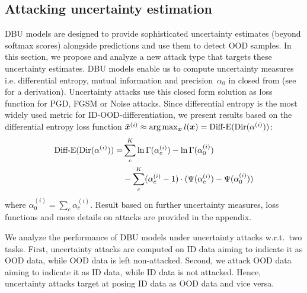 \subsection{Attacking uncertainty estimation}
\label{subsec:uncertainty_attacks}

DBU models are designed to provide sophisticated uncertainty estimates (beyond softmax scores) alongside predictions and use them to detect OOD samples. In this section, we propose and analyze a new attack type that targets these uncertainty estimates. 
DBU models enable us to compute uncertainty measures i.e. differential entropy, mutual information and precision~$\alpha_0$ in closed from (see \citep{malini2018} for a derivation). Uncertainty attacks use this closed form solution as loss function for PGD, FGSM or Noise attacks. 
Since differential entropy is the most widely used metric for ID-OOD-differentiation, we present results based on the differential entropy loss function $\tilde{{\bm{x}}}^{(i)} \approx \arg\max_{{\bm{x}}} l({\bm{x}}) = \text{Diff-E}(\text{Dir}(\mathbf{\alpha}^{(i)}))$: 
%
\begin{equation}
\begin{aligned}
	\text{Diff-E}(\text{Dir}(\mathbf{\alpha}^{(i)}))  = &\sum_c^K \ln \Gamma (\alpha_c^{(i)}) - \ln \Gamma (\alpha_0^{(i)}) \\
	&- \sum_c^K (\alpha_c^{(i)} -1) \cdot (\Psi (\alpha_c^{(i)}) - \Psi (\alpha_0^{(i)}))
\end{aligned}
\end{equation}
%
where $\alpha_0^{(i)} = \sum_c \alpha_c^{(i)}$. 
Result based on further uncertainty measures, loss functions and more details on attacks are provided in the appendix. 


We analyze the performance of DBU models under uncertainty attacks w.r.t.\ two tasks. First, uncertainty attacks are computed on ID data aiming to indicate it as OOD data, while OOD data is left non-attacked. Second, we attack OOD data aiming to indicate it as ID data, while ID data is not attacked. Hence, uncertainty attacks target at posing ID data as OOD data and vice versa.


